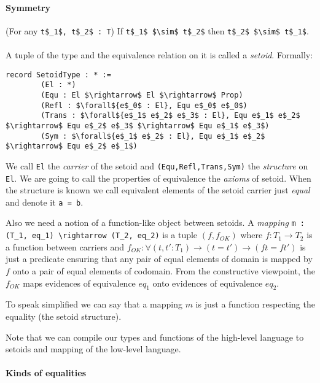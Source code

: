 \documentclass[11pt,oneside]{article}
\begin{document}
\paragraph{Symmetry}
(For any \lstinline[mathescape=true]|t$_1$, t$_2$ : T|) If
\lstinline[mathescape=true]|t$_1$ $\sim$ t$_2$| then
\lstinline[mathescape=true]|t$_2$ $\sim$ t$_1$|.

\paragraph{}
A tuple of the type and the equivalence relation on it is called
a {\em setoid}.
Formally:

\begin{lstlisting}[mathescape=true]
    record SetoidType : * :=
        (El : *)
        (Equ : El $\rightarrow$ El $\rightarrow$ Prop)
        (Refl : $\forall${e$_0$ : El}, Equ e$_0$ e$_0$)
        (Trans : $\forall${e$_1$ e$_2$ e$_3$ : El}, Equ e$_1$ e$_2$ $\rightarrow$ Equ e$_2$ e$_3$ $\rightarrow$ Equ e$_1$ e$_3$)
        (Sym : $\forall${e$_1$ e$_2$ : El}, Equ e$_1$ e$_2$ $\rightarrow$ Equ e$_2$ e$_1$)
\end{lstlisting}
We call \lstinline[mathescape=true]|El| the {\em carrier} of the setoid and \lstinline[mathescape=true]|(Equ,Refl,Trans,Sym)| the {\em structure} on \lstinline[mathescape=true]|El|.
We are going to call the properties of equivalence the {\em axioms} of setoid.
When the structure is known we call equivalent elements
of the setoid carrier just {\em equal} and denote it \lstinline[mathescape=true]|a = b|.

Also we need a notion of a function-like object between setoids.
A {\em mapping} \lstinline[mathescape=true]|m : (T_1, eq_1) \rightarrow (T_2, eq_2)| is a tuple
$(f, f_{OK})$ where $f : T_1 \rightarrow T_2$ is a function between carriers and
$f_{OK} : \forall (t, t' : T_1) \rightarrow (t = t') \rightarrow (f t = f t')$
is just a predicate ensuring that any pair of equal elements of domain
is mapped by $f$ onto a pair of equal elements of codomain.
From the constructive viewpoint, the $f_{OK}$ maps evidences of
equivalence $eq_1$ onto evidences of equivalence $eq_2$.

To speak simplified we can say that a mapping $m$ is just a function
respecting the equality (the setoid structure).

Note that we can compile our types and functions of the high-level language to setoids and mapping of the low-level language.

\paragraph{Kinds of equalities}
\end{document}
